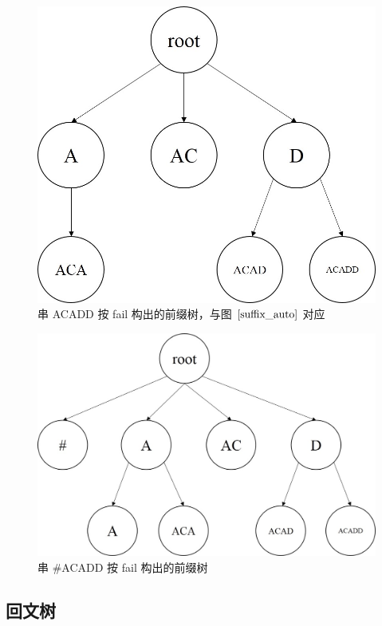 \documentclass{article}
\begin{document}
\begin{figure}
  \centering
  \includegraphics[scale=0.6]{suffix_auto2.jpg}
  \caption{串 ACADD 按 fail 构出的前缀树，与图 $\ref{suffix_auto}$ 对应}
  \label{suffix_auto2}
\end{figure}


\begin{figure}
  \centering
  \includegraphics[scale=0.6]{suffix_auto3.jpg}
  \caption{串 \#ACADD 按 fail 构出的前缀树}
  \label{suffix_auto3}
\end{figure}

\subsection{回文树}
\end{document}

